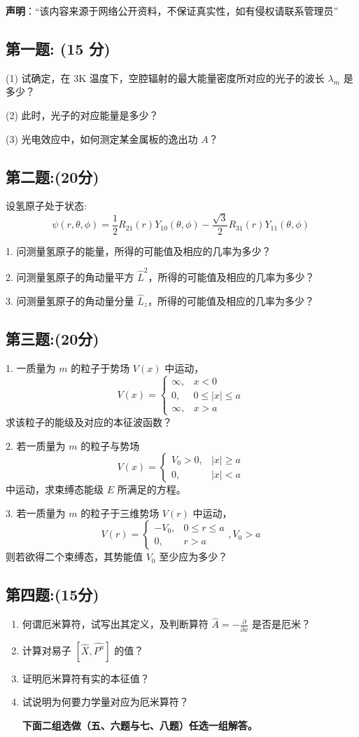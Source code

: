 
\textbf{声明}：“该内容来源于网络公开资料，不保证真实性，如有侵权请联系管理员”

\subsection{第一题: (15 分)}
(1) 试确定，在 3K 温度下，空腔辐射的最大能量密度所对应的光子的波长 $\lambda_m$ 是多少？

(2) 此时，光子的对应能量是多少？

(3) 光电效应中，如何测定某金属板的逸出功 $A$？
\subsection{第二题:(20分)}
设氢原子处于状态:$$\psi(r, \theta, \phi) = \frac{1}{2} R_{21}(r) Y_{10}(\theta, \phi) - \frac{\sqrt{3}}{2} R_{31}(r) Y_{11}(\theta, \phi)~$$

1. 问测量氢原子的能量，所得的可能值及相应的几率为多少？

2. 问测量氢原子的角动量平方 \( \hat{L}^2 \)，所得的可能值及相应的几率为多少？

3. 问测量氢原子的角动量分量 \( \hat{L}_z \)，所得的可能值及相应的几率为多少？
\subsection{第三题:(20分)}
1. 一质量为 \( m \) 的粒子于势场 \( V(x) \) 中运动，
$$
V(x) = 
\begin{cases} 
\infty, & x<0 \\
0, & 0 \leq |x| \leq a \\
\infty, & x > a 
\end{cases}~
$$
求该粒子的能级及对应的本征波函数？

2. 若一质量为 \( m \) 的粒子与势场
$$
V(x) = 
\begin{cases} 
V_0 > 0, & |x| \geq a \\
0, & |x| < a 
\end{cases}~
$$
中运动，求束缚态能级 \( E \) 所满足的方程。

3. 若一质量为 \( m \) 的粒子于三维势场 \( V(r) \) 中运动，
$$
V(r) = 
\begin{cases} 
-V_0, & 0 \leq r \leq a \\
0, & r > a
\end{cases},
V_0 > a~
$$
则若欲得二个束缚态，其势能值 \( V_0 \) 至少应为多少？
\subsection{第四题:(15分)}
\begin{enumerate}
    \item 何谓厄米算符，试写出其定义，及判断算符 $\hat{A} = -\frac{\partial}{\partial x}$ 是否是厄米？
    \item 计算对易子 $[\hat{X}, \hat{P^n}]$ 的值？
    \item 证明厄米算符有实的本征值？
    \item 试说明为何要力学量对应为厄米算符？
    
    \textbf{下面二组选做（五、六题与七、八题）任选一组解答。}
\end{enumerate}
